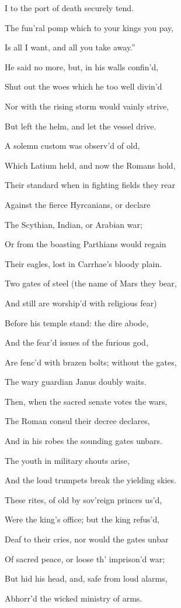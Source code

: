 I to the port of death securely tend.

The fun’ral pomp which to your kings you pay,

Is all I want, and all you take away.”

He said no more, but, in his walls confin’d,

Shut out the woes which he too well divin’d

Nor with the rising storm would vainly strive,

But left the helm, and let the vessel drive.

A solemn custom was observ’d of old,

Which Latium held, and now the Romans hold,

Their standard when in fighting fields they rear

Against the fierce Hyrcanians, or declare

The Scythian, Indian, or Arabian war;

Or from the boasting Parthians would regain

Their eagles, lost in Carrhae’s bloody plain.

Two gates of steel (the name of Mars they bear,

And still are worship’d with religious fear)

Before his temple stand: the dire abode,

And the fear’d issues of the furious god,

Are fenc’d with brazen bolts; without the gates,

The wary guardian Janus doubly waits.

Then, when the sacred senate votes the wars,

The Roman consul their decree declares,

And in his robes the sounding gates unbars.

The youth in military shouts arise,

And the loud trumpets break the yielding skies.

These rites, of old by sov’reign princes us’d,

Were the king’s office; but the king refus’d,

Deaf to their cries, nor would the gates unbar

Of sacred peace, or loose th’ imprison’d war;

But hid his head, and, safe from loud alarms,

Abhorr’d the wicked ministry of arms.

